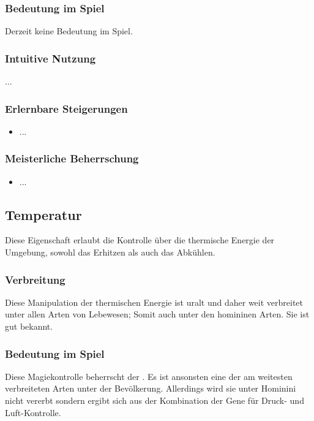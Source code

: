 \subsubsection{Bedeutung im Spiel}
Derzeit keine Bedeutung im Spiel.

\subsubsection{Intuitive Nutzung}
...

\subsubsection{Erlernbare Steigerungen}
\begin{itemize}
	\item ...
\end{itemize}

\subsubsection{Meisterliche Beherrschung} 
\begin{itemize}
	\item ...
\end{itemize}



\subsection{Temperatur}\label{sec:temperaturmagie}
Diese Eigenschaft erlaubt die Kontrolle über die thermische Energie der Umgebung, sowohl das Erhitzen als auch das Abkühlen.

\subsubsection{Verbreitung}
Diese Manipulation der thermischen Energie ist uralt und daher weit verbreitet unter allen Arten von Lebewesen; Somit auch unter den homininen Arten. Sie ist gut bekannt.

\subsubsection{Bedeutung im Spiel}
Diese Magiekontrolle beherrscht der . Es ist ansonsten eine der am weitesten verbreiteten Arten unter der Bevölkerung. Allerdings wird sie unter Hominini nicht vererbt sondern ergibt sich aus der Kombination der Gene für Druck- und Luft-Kontrolle.

